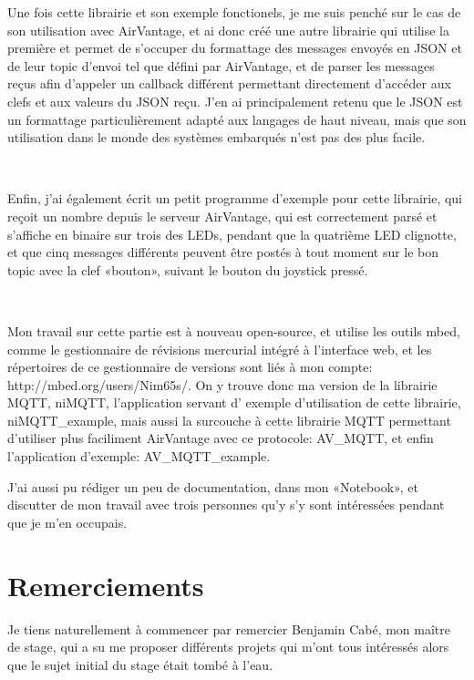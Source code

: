 \documentclass{article}
\begin{document}
Une fois cette librairie et son exemple fonctionels, je me suis penché sur le cas de son utilisation avec AirVantage, et ai donc créé une autre librairie qui utilise la première et permet de s’occuper du formattage des messages envoyés en JSON et de leur topic d’envoi tel que défini par AirVantage, et de parser les messages reçus afin d’appeler un callback différent permettant directement d’accéder aux clefs et aux valeurs du JSON reçu. J’en ai principalement retenu que le JSON est un formattage particulièrement adapté aux langages de haut niveau, mais que son utilisation dans le monde des systèmes embarqués n’est pas des plus facile.

~

Enfin, j’ai également écrit un petit programme d’exemple pour cette librairie, qui reçoit un nombre depuis le serveur AirVantage, qui est correctement parsé et s’affiche en binaire sur trois des LEDs, pendant que la quatrième LED clignotte, et que cinq messages différents peuvent être postés à tout moment sur le bon topic avec la clef «bouton», suivant le bouton du joystick pressé.


~

Mon travail sur cette partie est à nouveau open-source, et utilise les outils mbed, comme le gestionnaire de révisions mercurial intégré à l’interface web, et les répertoires de ce gestionnaire de versions sont liés à mon compte: http://mbed.org/users/Nim65s/. On y trouve donc ma version de la librairie MQTT, niMQTT, l’application servant d’ exemple d’utilisation de cette librairie, niMQTT\_example, mais aussi la surcouche à cette librairie MQTT permettant d’utiliser plus faciliment AirVantage avec ce protocole: AV\_MQTT, et enfin l’application d’exemple: AV\_MQTT\_example.

J’ai aussi pu rédiger un peu de documentation, dans mon «Notebook», et discutter de mon travail avec trois personnes qu’y s’y sont intéressées pendant que je m’en occupais.

\clearpage

\section{Remerciements}

Je tiens naturellement à commencer par remercier Benjamin Cabé, mon maître de stage, qui a su me proposer différents projets qui m’ont tous intéressés alors que le sujet initial du stage était tombé à l’eau.

~
\end{document}
